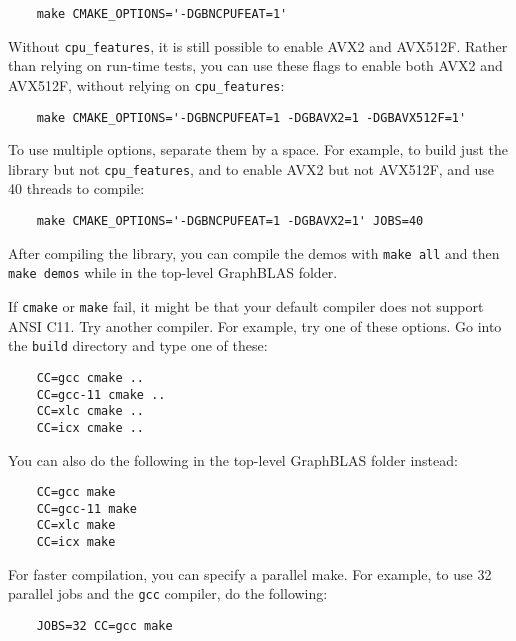 \documentclass[12pt]{article}
\begin{document}
    {\small
    \begin{verbatim}
    make CMAKE_OPTIONS='-DGBNCPUFEAT=1'  \end{verbatim} }

Without \verb'cpu_features', it is still possible to enable AVX2 and AVX512F.
Rather than relying on run-time tests, you can use these flags to enable
both AVX2 and AVX512F, without relying on \verb'cpu_features':

    {\small
    \begin{verbatim}
    make CMAKE_OPTIONS='-DGBNCPUFEAT=1 -DGBAVX2=1 -DGBAVX512F=1' \end{verbatim} }

To use multiple options, separate them by a space.  For example, to build
just the library but not \verb'cpu_features', and to enable
AVX2 but not AVX512F, and use 40 threads to compile:

    {\small
    \begin{verbatim}
    make CMAKE_OPTIONS='-DGBNCPUFEAT=1 -DGBAVX2=1' JOBS=40 \end{verbatim} }

After compiling the library, you can compile the demos with
\verb'make all' and then \verb'make demos' while in the top-level
GraphBLAS folder.

If \verb'cmake' or \verb'make' fail, it might be that your default compiler
does not support ANSI C11.  Try another compiler.  For example, try one of
these options.  Go into the \verb'build' directory and type one of these:

    {\small
    \begin{verbatim}
    CC=gcc cmake ..
    CC=gcc-11 cmake ..
    CC=xlc cmake ..
    CC=icx cmake ..  \end{verbatim} }

You can also do the following in the top-level GraphBLAS folder instead:

    {\small
    \begin{verbatim}
    CC=gcc make
    CC=gcc-11 make
    CC=xlc make
    CC=icx make \end{verbatim} }

For faster compilation, you can specify a parallel make.  For example,
to use 32 parallel jobs and the \verb'gcc' compiler, do the following:

    {\small
    \begin{verbatim}
    JOBS=32 CC=gcc make \end{verbatim} }

\end{document}

